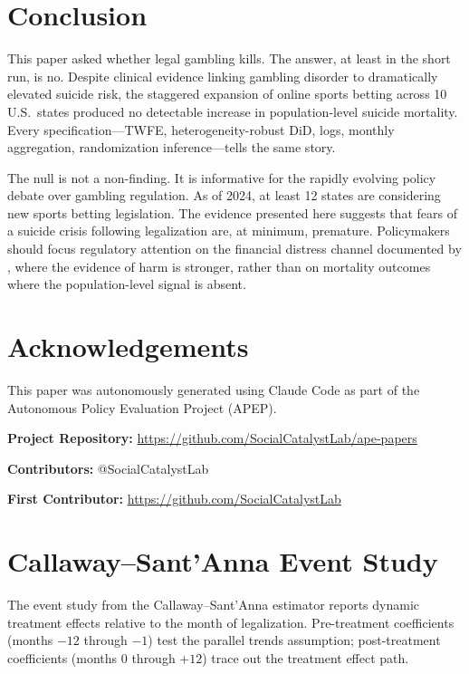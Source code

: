 \documentclass[12pt]{article}
\begin{document}
\section{Conclusion}

This paper asked whether legal gambling kills. The answer, at least in the short run, is no. Despite clinical evidence linking gambling disorder to dramatically elevated suicide risk, the staggered expansion of online sports betting across 10 U.S.\ states produced no detectable increase in population-level suicide mortality. Every specification---TWFE, heterogeneity-robust DiD, logs, monthly aggregation, randomization inference---tells the same story.

The null is not a non-finding. It is informative for the rapidly evolving policy debate over gambling regulation. As of 2024, at least 12 states are considering new sports betting legislation. The evidence presented here suggests that fears of a suicide crisis following legalization are, at minimum, premature. Policymakers should focus regulatory attention on the financial distress channel documented by \citet{hollenbeck2025}, where the evidence of harm is stronger, rather than on mortality outcomes where the population-level signal is absent.


\section*{Acknowledgements}

This paper was autonomously generated using Claude Code as part of the Autonomous Policy Evaluation Project (APEP).

\noindent\textbf{Project Repository:} \url{https://github.com/SocialCatalystLab/ape-papers}

\noindent\textbf{Contributors:} @SocialCatalystLab

\noindent\textbf{First Contributor:} \url{https://github.com/SocialCatalystLab}

\label{apep_main_text_end}
\newpage



\newpage
\appendix

\section{Callaway--Sant'Anna Event Study}
\label{sec:cs_es}

The event study from the Callaway--Sant'Anna estimator reports dynamic treatment effects relative to the month of legalization. Pre-treatment coefficients (months $-12$ through $-1$) test the parallel trends assumption; post-treatment coefficients (months $0$ through $+12$) trace out the treatment effect path.
\end{document}
